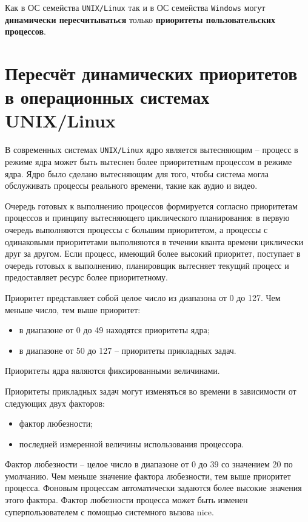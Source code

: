 Как в ОС семейства \texttt{UNIX/Linux} так и в ОС семейства \texttt{Windows} могут \textbf{динамически пересчитываться} только \textbf{приоритеты пользовательских процессов}.

\section{Пересчёт динамических приоритетов в операционных системах UNIX/Linux}

В современных системах \texttt{UNIX/Linux} ядро является вытесняющим – процесс в режиме ядра может быть вытеснен более приоритетным процессом в режиме ядра. Ядро было сделано вытесняющим для того, чтобы система могла обслуживать процессы реального времени, такие как аудио и видео.

Очередь готовых к выполнению процессов формируется согласно приоритетам процессов и принципу вытесняющего циклического планирования: в первую очередь выполняются процессы с большим приоритетом, а процессы с одинаковыми приоритетами выполняются в течении кванта времени циклически друг за другом. Если процесс, имеющий более высокий приоритет, поступает в очередь готовых к выполнению, планировщик вытесняет текущий процесс и предоставляет ресурс более приоритетному.

Приоритет представляет собой целое число из диапазона от 0 до 127. Чем меньше число, тем выше приоритет:
\begin{itemize}
    \item в диапазоне от 0 до 49 находятся приоритеты ядра;
    \item в диапазоне от 50 до 127 – приоритеты прикладных задач.
\end{itemize}

Приоритеты ядра являются фиксированными величинами.

Приоритеты прикладных задач могут изменяться во времени в зависимости от следующих двух факторов:
\begin{itemize}
    \item фактор любезности;
    \item последней измеренной величины использования процессора.
\end{itemize}

Фактор любезности – целое число в диапазоне от 0 до 39 со значением 20 по умолчанию. Чем меньше значение фактора любезности, тем выше приоритет процесса. Фоновым процессам автоматически задаются более высокие значения этого фактора. Фактор любезности процесса может быть изменен суперпользователем с помощью системного вызова nice.

